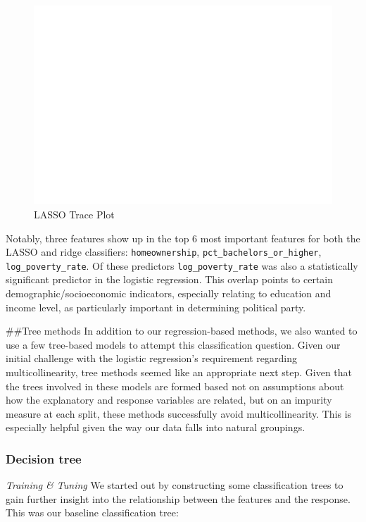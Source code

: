 \documentclass[
]{article}
\begin{document}
\begin{figure}

{\centering \includegraphics[width=0.8\linewidth]{../results/lasso-trace-plot} 

}

\caption{LASSO Trace Plot}\label{fig:lasso-trace}
\end{figure}

Notably, three features show up in the top 6 most important features for both the LASSO and ridge classifiers: \texttt{homeownership}, \texttt{pct\_bachelors\_or\_higher}, \texttt{log\_poverty\_rate}. Of these predictors \texttt{log\_poverty\_rate} was also a statistically significant predictor in the logistic regression. This overlap points to certain demographic/socioeconomic indicators, especially relating to education and income level, as particularly important in determining political party.

\#\#Tree methods
In addition to our regression-based methods, we also wanted to use a few tree-based models to attempt this classification question. Given our initial challenge with the logistic regression's requirement regarding multicollinearity, tree methods seemed like an appropriate next step. Given that the trees involved in these models are formed based not on assumptions about how the explanatory and response variables are related, but on an impurity measure at each split, these methods successfully avoid multicollinearity. This is especially helpful given the way our data falls into natural groupings.

\hypertarget{decision-tree}{%
\subsubsection{Decision tree}\label{decision-tree}}

\emph{Training \& Tuning}
We started out by constructing some classification trees to gain further insight into the relationship between the features and the response. This was our baseline classification tree:
\end{document}

